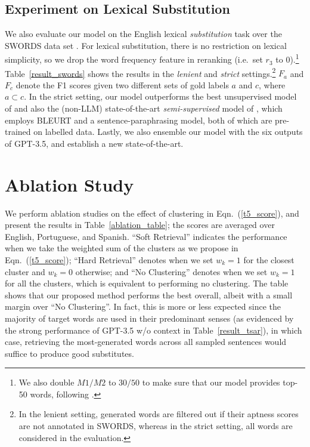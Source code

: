 \documentclass[11pt]{article}
\newcommand{\tabref}[2][]{Table#1~\ref{#2}\xspace}
\newcommand{\eqnref}[2][]{Eqn#1.~(\ref{#2})\xspace}
\newcommand{\ex}[1]{\textit{#1}\xspace}
\begin{document}
\subsection{Experiment on Lexical Substitution}

We also evaluate our model on the English lexical {\it substitution} task over the SWORDS data set \cite{swords}. For lexical substitution, there is no restriction on lexical simplicity, so we drop the word frequency feature in reranking (i.e.\ set $r_3$ to $0$).\footnote{We also double $M1/M2$ to $30/50$ to make sure that our model provides top-50 words, following \citet{wada-etal-2022-unsupervised}.} \tabref[]{result_swords} shows the results in the {\it lenient} and  {\it strict} settings.\footnote{In the lenient setting, generated words are filtered out if their aptness scores are not annotated in SWORDS, whereas in the strict setting, all words are considered in the evaluation.} $F_a$ and $F_c$ denote the F1 scores given two different sets of gold labels $a$ and $c$, where $a \subset c$. In the strict setting, our model outperforms the best unsupervised model of \citet{wada-etal-2022-unsupervised} and also the (non-LLM) state-of-the-art \ex{semi-supervised} model of \citet{qiang-etal-2023-parals}, which employs BLEURT \cite{sellam-etal-2020-bleurt} and a sentence-paraphrasing model, both of which are pre-trained on labelled data. Lastly, we also ensemble our model with the six outputs of GPT-3.5, and establish a new state-of-the-art.





\section{Ablation Study}\label{ablation_study}

We perform ablation studies on the effect of clustering in \eqnref[]{t5_score}, and present the results in \tabref[]{ablation_table}; the scores are averaged over English, Portuguese, and Spanish. ``Soft Retrieval'' indicates the performance when we take the weighted sum of the clusters as we propose in \eqnref[]{t5_score}; ``Hard Retrieval'' denotes when we set $w_k = 1$ for the closest cluster and $w_k = 0$ otherwise; and ``No Clustering'' denotes when we set $w_k = 1$ for all the clusters, which is equivalent to performing no clustering. The table shows that our proposed method performs the best overall, albeit with a small margin over ``No Clustering''. In fact, this is more or less expected since the majority of target words are used in their predominant senses (as evidenced by the strong performance of GPT-3.5 w/o context in \tabref[]{result_tsar}), in which case, retrieving the most-generated words across all sampled sentences would suffice to produce good substitutes.
\end{document}
